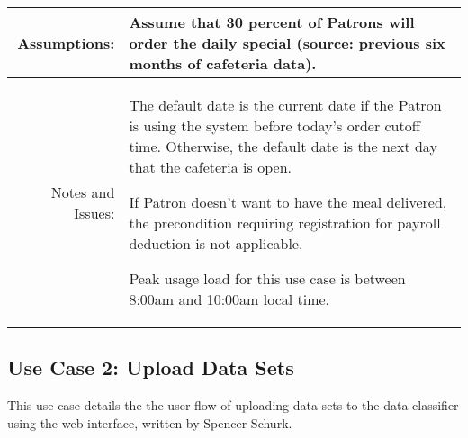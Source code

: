 \documentclass[12pt,oneside,letterpaper]{article}
\newenvironment{packed_enumerate}{ %
\vspace{-7mm}
\begin{enumerate}
  \setlength{\itemsep}{0pt}
  \setlength{\parskip}{0pt}
  \setlength{\parsep}{0pt}
}{\end{enumerate}
\vspace{-8mm}}
\begin{document}
\begin{longtable}{|r|p{3.8in}|}
\hline
Assumptions:&Assume that 30 percent of Patrons will order the daily special (source: previous six months of cafeteria data).\\
\hline
Notes and Issues:&
\begin{packed_enumerate}
\item The default date is the current date if the Patron is using the system before today's order cutoff time. Otherwise, the default date is the next day that the cafeteria is open.
\item If Patron doesn't want to have the meal delivered, the precondition requiring registration for payroll deduction is not applicable.
\item Peak usage load for this use case is between 8:00am and 10:00am local time.
\end{packed_enumerate}\\
\hline
\end{longtable}


\subsection{\label{Upload Data Sets}Use Case 2: Upload Data Sets}
This use case details the the user flow of uploading data sets to the data classifier using the web interface, written by Spencer Schurk.
\end{document}
